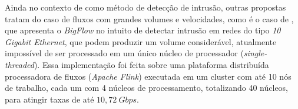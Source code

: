 Ainda no contexto de \nd como método de detecção de intrusão,
outras propostas tratam do caso de fluxos com grandes volumes e velocidades, como é o caso
de , que apresenta o \emph{BigFlow} no intuito de detectar
intrusão em redes do tipo \emph{10 Gigabit Ethernet}, que podem produzir um volume considerável,
atualmente impossível de ser processado em um único núcleo de processador
(\emph{single-threaded}).
Essa implementação foi feita sobre uma plataforma
distribuída processadora de fluxos (\emph{Apache Flink}) executada em um cluster
com até 10 nós de trabalho, cada um com 4 núcleos de processamento, totalizando
40 núcleos, para atingir taxas de até $10,72 \ Gbps$.





